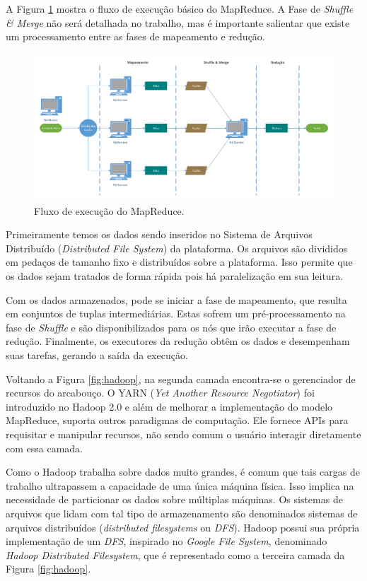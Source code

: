 A Figura \ref{fig:mrworkflow} mostra o fluxo de execução básico do MapReduce. 
A Fase de \emph{Shuffle \& Merge} não será detalhada no trabalho, mas é 
importante salientar que existe um processamento entre as fases de mapeamento e 
redução.

\begin{figure}[ht]
 \centerline{\includegraphics[width=1\textwidth]{./img/mapreduce-workflow.pdf}}
 \caption{Fluxo de execução do MapReduce.}
 \label{fig:mrworkflow}
\end{figure}

Primeiramente temos os dados sendo inseridos no Sistema de Arquivos Distribuído 
(\emph{Distributed File System}) da plataforma. Os arquivos são divididos em 
pedaços de tamanho fixo e distribuídos sobre a plataforma. Isso permite que os 
dados sejam tratados de forma rápida pois há paralelização em sua leitura.

Com os dados armazenados, pode se iniciar a fase de mapeamento, que resulta em 
conjuntos de tuplas intermediárias. Estas sofrem um pré-processamento na fase 
de \emph{Shuffle} e são disponibilizados para os nós que irão executar a fase 
de redução. Finalmente, os executores da redução obtêm os dados e desempenham 
suas tarefas, gerando a saída da execução.

Voltando a Figura \ref{fig:hadoop}, na segunda camada encontra-se o gerenciador 
de recursos do arcabouço. O YARN (\textit{Yet Another Resource Negotiator}) foi 
introduzido no Hadoop 2.0 e além de melhorar a implementação do modelo 
MapReduce, suporta outros paradigmas de computação. Ele fornece APIs para 
requisitar e manipular recursos, não sendo comum o usuário interagir 
diretamente com essa camada.

Como o Hadoop trabalha sobre dados muito grandes, é comum que tais cargas de 
trabalho ultrapassem a capacidade de uma única máquina física. Isso implica na 
necessidade de particionar os dados sobre múltiplas máquinas. Os sistemas de 
arquivos que lidam com tal tipo de armazenamento são denominados sistemas de 
arquivos distribuídos (\textit{distributed filesystems} ou \textit{DFS}). 
Hadoop possui sua própria implementação de um \textit{DFS}, inspirado no 
\textit{Google File System}, denominado \textit{Hadoop Distributed Filesystem}, 
que é representado como a terceira camada da Figura \ref{fig:hadoop}.

